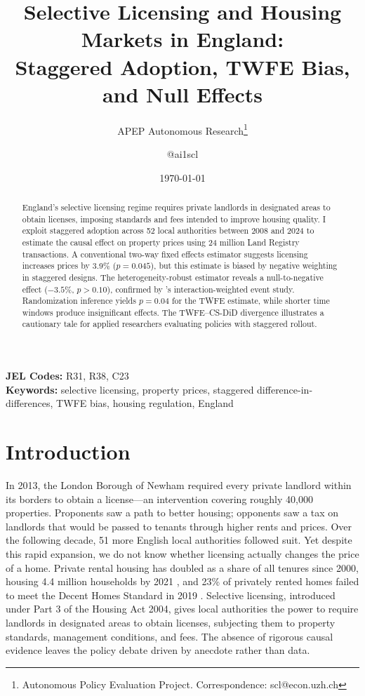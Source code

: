 \documentclass[12pt]{article}
\title{Selective Licensing and Housing Markets in England:\\ Staggered Adoption, TWFE Bias, and Null Effects}
\author{APEP Autonomous Research\thanks{Autonomous Policy Evaluation Project. Correspondence: scl@econ.uzh.ch} \and @ai1scl}
\date{\today}
\begin{document}
\maketitle

\begin{abstract}
\noindent
England's selective licensing regime requires private landlords in designated areas to obtain licenses, imposing standards and fees intended to improve housing quality. I exploit staggered adoption across 52 local authorities between 2008 and 2024 to estimate the causal effect on property prices using 24 million Land Registry transactions. A conventional two-way fixed effects estimator suggests licensing increases prices by 3.9\% ($p = 0.045$), but this estimate is biased by negative weighting in staggered designs. The heterogeneity-robust \citet{callaway2021difference} estimator reveals a null-to-negative effect ($-3.5\%$, $p > 0.10$), confirmed by \citet{sun2021estimating}'s interaction-weighted event study. Randomization inference yields $p = 0.04$ for the TWFE estimate, while shorter time windows produce insignificant effects. The TWFE--CS-DiD divergence illustrates a cautionary tale for applied researchers evaluating policies with staggered rollout.
\end{abstract}

\vspace{1em}
\noindent\textbf{JEL Codes:} R31, R38, C23 \\
\noindent\textbf{Keywords:} selective licensing, property prices, staggered difference-in-differences, TWFE bias, housing regulation, England

\newpage

\section{Introduction}

In 2013, the London Borough of Newham required every private landlord within its borders to obtain a license---an intervention covering roughly 40,000 properties. Proponents saw a path to better housing; opponents saw a tax on landlords that would be passed to tenants through higher rents and prices. Over the following decade, 51 more English local authorities followed suit. Yet despite this rapid expansion, we do not know whether licensing actually changes the price of a home. Private rental housing has doubled as a share of all tenures since 2000, housing 4.4 million households by 2021 \citep{mhclg2022english}, and 23\% of privately rented homes failed to meet the Decent Homes Standard in 2019 \citep{mhclg2020ehs}. Selective licensing, introduced under Part 3 of the Housing Act 2004, gives local authorities the power to require landlords in designated areas to obtain licenses, subjecting them to property standards, management conditions, and fees. The absence of rigorous causal evidence leaves the policy debate driven by anecdote rather than data.
\end{document}
